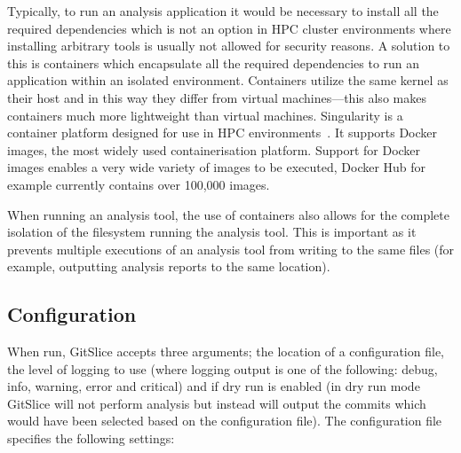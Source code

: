 Typically, to run an analysis application it would be necessary to install all the required dependencies which is not an option in HPC cluster environments where installing arbitrary tools is usually not allowed for security reasons.
A solution to this is containers which encapsulate all the required dependencies to run an application within an isolated environment.
Containers utilize the same kernel as their host and in this way they differ from virtual machines---this also makes containers much more lightweight than virtual machines.
Singularity is a container platform designed for use in HPC environments~\cite{singularity}.
It supports Docker images, the most widely used containerisation platform.
Support for Docker images enables a very wide variety of images to be executed, Docker Hub for example currently contains over 100,000 images.

When running an analysis tool, the use of containers also allows for the complete isolation of the filesystem running the analysis tool.
This is important as it prevents multiple executions of an analysis tool from writing to the same files (for example, outputting analysis reports to the same location).

\subsection{Configuration}
\label{subsec:configuration}

When run, GitSlice accepts three arguments; the location of a configuration file, the level of logging to use (where logging output is one of the following: debug, info, warning, error and critical) and if dry run is enabled (in dry run mode GitSlice will not perform analysis but instead will output the commits which would have been selected based on the configuration file).
The configuration file specifies the following settings:

